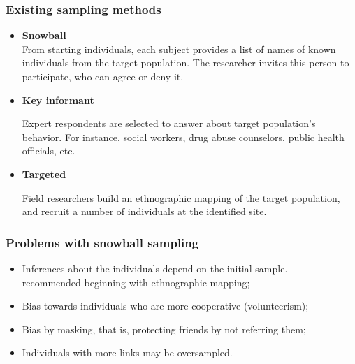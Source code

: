 \documentclass{beamer}
\newcommand{\Space}{\vspace{3ex}}
\begin{document}
\begin{frame}
    
    \frametitle{Existing sampling methods}

    \begin{itemize}
        \justifying

        \item<1> {\bf Snowball} \cite{goodman1961} \\
        
        From starting individuals, each subject provides a list of names of known
        individuals from the target population. The researcher invites this person
        to participate, who can agree or deny it. 
    \end{itemize}

    

    \Space

    \begin{itemize}
      \justifying

      \item<2> {\bf Key informant} \cite{deaux-callaghan1985}
    
      Expert respondents are selected to answer about target population's behavior. For
      instance, social workers, drug abuse counselors, public health officials, etc. 
    \end{itemize}


    \Space

    \begin{itemize}
      \justifying

      \item<3> {\bf Targeted} \cite{watters-biernacki1989}
  
      Field researchers build an ethnographic mapping of the target population,
      and recruit a number of individuals at the identified site.
    \end{itemize}


\end{frame}

\begin{frame}

  \frametitle{Problems with snowball sampling}

  \begin{itemize}
    \justifying
    \item Inferences about the individuals depend on the initial sample. \\
    \cite{frank1994estimating} recommended beginning with ethnographic mapping;
    \Space
    \item Bias towards individuals who are more cooperative (volunteerism);
    \Space
    \item Bias by masking, that is, protecting friends by not referring them;
    \Space
    \item Individuals with more links may be oversampled.  
  \end{itemize}
  
\end{frame}
\end{document}
